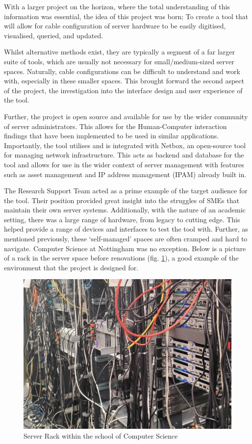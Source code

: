 \documentclass [11pt,a4paper]{article}
\begin{document}
With a larger project on the horizon, where the total understanding of this information was essential, the idea of this project was born; To create a tool that will allow for cable configuration of server hardware to be easily digitised, visualised, queried, and updated.

Whilst alternative methods exist, they are typically a segment of a far larger suite of tools, which are usually not necessary for small/medium-sized server spaces. Naturally, cable configurations can be difficult to understand and work with, especially in these smaller spaces. This brought forward the second aspect of the project, the investigation into the interface design and user experience of the tool.

Further, the project is open source and available for use by the wider community of server administrators. This  allows for the Human-Computer interaction findings that have been implemented to be used in similar applications. Importantly, the tool utilises and is integrated with Netbox\cite{Netbox}, an open-source tool for managing network infrastructure. This acts as backend and database for the tool and allows for use in the wider context of server management with features such as asset management and IP address management (IPAM) already built in.

The Research Support Team acted as a prime example of the target audience for the tool. Their position provided great insight into the struggles of SMEs that maintain their own server systems. Additionally, with the nature of an academic setting, there was a large range of hardware, from legacy to cutting edge. This helped provide a range of devices and interfaces to test the tool with. Further, as mentioned previously, these `self-managed' spaces are often cramped and hard to navigate. Computer Science at Nottingham was no exception. Below is a picture of a rack in the server space before renovations (fig. \ref{fig:server_rack}), a good example of the environment that the project is designed for.

\begin{figure}[H]
    \centering
    \includegraphics[width=0.40\linewidth]{images/server_racks.jpg}
    \caption{Server Rack within the school of Computer Science}
    \label{fig:server_rack}
\end{figure}
\end{document}
